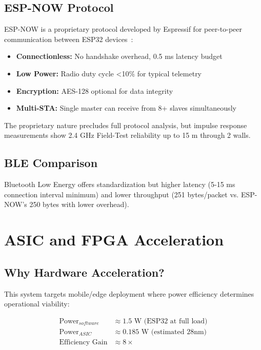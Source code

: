 \subsection{ESP-NOW Protocol}

ESP-NOW is a proprietary protocol developed by Espressif for peer-to-peer communication between ESP32 devices~\cite{espressif2023}:

\begin{itemize}
    \item \textbf{Connectionless:} No handshake overhead, 0.5 ms latency budget
    \item \textbf{Low Power:} Radio duty cycle <10\% for typical telemetry
    \item \textbf{Encryption:} AES-128 optional for data integrity
    \item \textbf{Multi-STA:} Single master can receive from 8+ slaves simultaneously
\end{itemize}

The proprietary nature precludes full protocol analysis, but impulse response measurements show 2.4 GHz Field-Test reliability up to 15 m through 2 walls.

\subsection{BLE Comparison}

Bluetooth Low Energy offers standardization but higher latency (5-15 ms connection interval minimum) and lower throughput (251 bytes/packet vs. ESP-NOW's 250 bytes with lower overhead).

\section{ASIC and FPGA Acceleration}

\subsection{Why Hardware Acceleration?}

This system targets mobile/edge deployment where power efficiency determines operational viability:

\begin{align}
    \text{Power}_{software} &\approx 1.5 \text{ W (ESP32 at full load)} \\
    \text{Power}_{ASIC} &\approx 0.185 \text{ W (estimated 28nm)} \\
    \text{Efficiency Gain} &\approx 8\times
\end{align}

